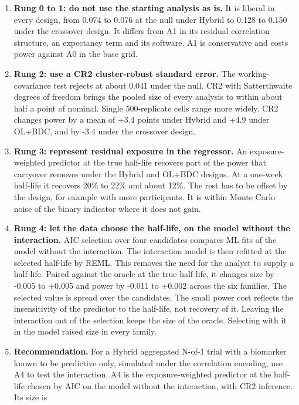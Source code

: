 \documentclass[
  11pt,
]{article}
\providecommand{\tightlist}{%
  \setlength{\itemsep}{0pt}\setlength{\parskip}{0pt}}
\begin{document}
\begin{enumerate}
\def\labelenumi{\arabic{enumi}.}
\tightlist
\item
  \textbf{Rung 0 to 1: do not use the starting analysis as is.} It is
  liberal in every design, from 0.074 to 0.076 at the null
  under Hybrid to 0.128 to 0.150 under the crossover design. It
  differs from A1 in its residual correlation structure, an
  expectancy term and its software.
  A1 is conservative and costs power against A0 in the base grid.
\item
  \textbf{Rung 2: use a CR2 cluster-robust standard error.} The
  working-covariance test rejects at about
  0.041 under the null. CR2 with
  Satterthwaite degrees of freedom brings the pooled size of every
  analysis to within about half a point of nominal. Single
  500-replicate cells
  range more widely. CR2 changes power by a mean of
  +3.4 points under
  Hybrid and +4.9 under
  OL+BDC, and by -3.4 under
  the crossover design.
\item
  \textbf{Rung 3: represent residual exposure in the regressor.} An
  exposure-weighted predictor at the true half-life recovers part of
  the power that carryover removes under the Hybrid and OL+BDC
  designs. At a one-week half-life it recovers 20\% to 22\%
  and about 12\%. The rest has to be offset by the design,
  for example with more participants. It is within Monte Carlo noise
  of the binary indicator where it does not gain.
\item
  \textbf{Rung 4: let the data choose the half-life, on the model without
  the interaction.} AIC selection over four candidates compares ML
  fits of the model without the interaction. The interaction model
  is then refitted at the selected half-life by REML. This removes
  the need for the analyst to supply a half-life. Paired against the
  oracle at the true half-life, it changes size by
  -0.005 to +0.005 and power by
  -0.011 to +0.002 across the six families. The
  selected value is spread over the candidates. The small power cost
  reflects the insensitivity of the predictor to the half-life, not
  recovery of it. Leaving the interaction out of the selection keeps
  the size of the oracle. Selecting with it in
  the model raised size in every family.
\item
  \textbf{Recommendation.} For a Hybrid aggregated N-of-1 trial with a
  biomarker known to be predictive only, simulated under the
  correlation encoding, use A4 to test the interaction. A4 is the
  exposure-weighted predictor at the half-life chosen by AIC on the
  model without the interaction, with CR2 inference. Its size is

\end{enumerate}
\end{document}
